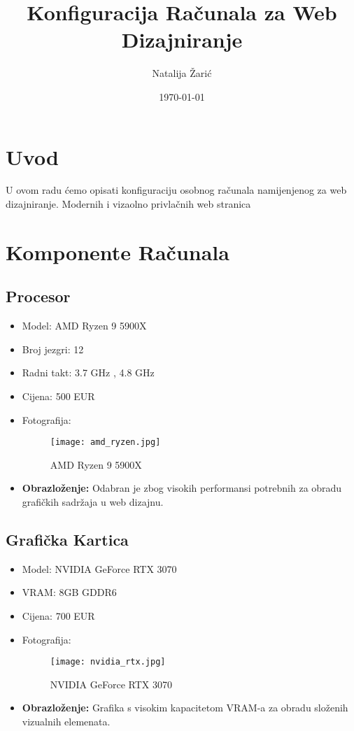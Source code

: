 \documentclass[30pt, letterpaper,utf8,a4paper]{article}
\title{Konfiguracija Računala za Web Dizajniranje}
\author{Natalija Žarić}
\date{\today}
\begin{document}
\maketitle
\newpage


\tableofcontents



\newpage


\section{Uvod}
U ovom radu ćemo opisati  konfiguraciju osobnog računala namijenjenog za web dizajniranje. Modernih i vizaolno privlačnih web stranica
\section{Komponente Računala}






\subsection{Procesor}
\begin{itemize}
    \item Model: AMD Ryzen 9 5900X
    \item Broj jezgri: 12
    \item Radni takt: 3.7 GHz , 4.8 GHz 
    \item Cijena: 500 EUR
    \item Fotografija: \begin{figure}[H]
        \centering
        \texttt{[image: amd\_ryzen.jpg]}
        \caption{AMD Ryzen 9 5900X}
    \end{figure}
    \item \textbf{Obrazloženje:} Odabran je zbog visokih performansi potrebnih za obradu grafičkih sadržaja u web dizajnu.
\end{itemize}

\subsection{Grafička Kartica}
\begin{itemize}
    \item Model: NVIDIA GeForce RTX 3070
    \item VRAM: 8GB GDDR6
    \item Cijena: 700 EUR
    \item Fotografija: \begin{figure}[H]
        \centering
        \texttt{[image: nvidia\_rtx.jpg]}
        \caption{NVIDIA GeForce RTX 3070}
    \end{figure}
    \item \textbf{Obrazloženje:} Grafika s visokim kapacitetom VRAM-a za obradu složenih vizualnih elemenata.
\end{itemize}
\end{document}
